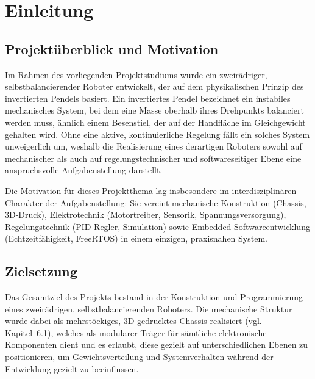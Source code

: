 \documentclass[12pt,ngerman,numbers=noenddot,abstracton,headsepline]{scrreprt}
\begin{document}
\newpage{}

\setcounter{page}{3}

\printglossary[type=\acronymtype,title=Abkürzungsverzeichnis]

\newpage{}

\chapter{Einleitung}
\label{ch:einleitung}

\section{Projektüberblick und Motivation}
\label{sec:projektueberblick}

Im Rahmen des vorliegenden Projektstudiums wurde ein zweirädriger, selbstbalancierender Roboter entwickelt, der auf dem physikalischen Prinzip des invertierten Pendels basiert. Ein invertiertes Pendel bezeichnet ein instabiles mechanisches System, bei dem eine Masse oberhalb ihres Drehpunkts balanciert werden muss, ähnlich einem Besenstiel, der auf der Handfläche im Gleichgewicht gehalten wird. Ohne eine aktive, kontinuierliche Regelung fällt ein solches System unweigerlich um, weshalb die Realisierung eines derartigen Roboters sowohl auf mechanischer als auch auf regelungstechnischer und softwareseitiger Ebene eine anspruchsvolle Aufgabenstellung darstellt.

Die Motivation für dieses Projektthema lag insbesondere im interdisziplinären Charakter der Aufgabenstellung: Sie vereint mechanische Konstruktion (Chassis, 3D-Druck), Elektrotechnik (Motortreiber, Sensorik, Spannungsversorgung), Regelungstechnik (PID-Regler, Simulation) sowie Embedded-Softwareentwicklung (Echtzeitfähigkeit, FreeRTOS) in einem einzigen, praxisnahen System.

\section{Zielsetzung}
\label{sec:zielsetzung}

Das Gesamtziel des Projekts bestand in der Konstruktion und Programmierung eines zweirädrigen, selbstbalancierenden Roboters. Die mechanische Struktur wurde dabei als mehrstöckiges, 3D-gedrucktes Chassis realisiert (vgl. Kapitel~6.1), welches als modularer Träger für sämtliche elektronische Komponenten dient und es erlaubt, diese gezielt auf unterschiedlichen Ebenen zu positionieren, um Gewichtsverteilung und Systemverhalten während der Entwicklung gezielt zu beeinflussen.
\end{document}
